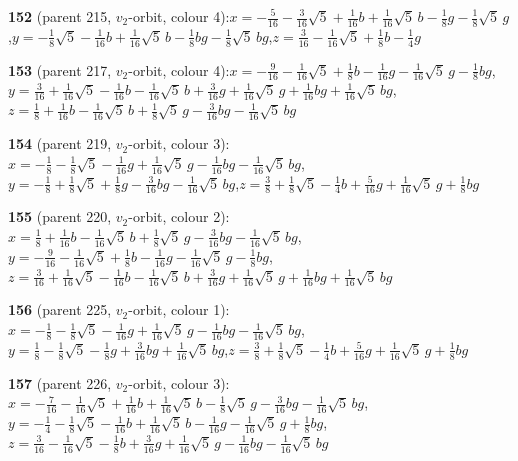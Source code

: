 \documentclass[10pt]{article}
\begin{document}
{\noindent\textbf{152} (parent 215, $v_2$-orbit, colour 4):\quad $x=-\tfrac{5}{16}-\tfrac{3}{16}\sqrt5+\tfrac{1}{16}b+\tfrac{1}{16}\sqrt5\,b-\tfrac{1}{8}g-\tfrac{1}{8}\sqrt5\,g$,\quad $y=-\tfrac{1}{8}\sqrt5-\tfrac{1}{16}b+\tfrac{1}{16}\sqrt5\,b-\tfrac{1}{8}bg-\tfrac{1}{8}\sqrt5\,bg$,\quad $z=\tfrac{3}{16}-\tfrac{1}{16}\sqrt5+\tfrac{1}{8}b-\tfrac{1}{4}g$\par\smallskip
\noindent\textbf{153} (parent 217, $v_2$-orbit, colour 4):\quad $x=-\tfrac{9}{16}-\tfrac{1}{16}\sqrt5+\tfrac{1}{8}b-\tfrac{1}{16}g-\tfrac{1}{16}\sqrt5\,g-\tfrac{1}{8}bg$,\quad $y=\tfrac{3}{16}+\tfrac{1}{16}\sqrt5-\tfrac{1}{16}b-\tfrac{1}{16}\sqrt5\,b+\tfrac{3}{16}g+\tfrac{1}{16}\sqrt5\,g+\tfrac{1}{16}bg+\tfrac{1}{16}\sqrt5\,bg$,\quad $z=\tfrac{1}{8}+\tfrac{1}{16}b-\tfrac{1}{16}\sqrt5\,b+\tfrac{1}{8}\sqrt5\,g-\tfrac{3}{16}bg-\tfrac{1}{16}\sqrt5\,bg$\par\smallskip
\noindent\textbf{154} (parent 219, $v_2$-orbit, colour 3):\quad $x=-\tfrac{1}{8}-\tfrac{1}{8}\sqrt5-\tfrac{1}{16}g+\tfrac{1}{16}\sqrt5\,g-\tfrac{1}{16}bg-\tfrac{1}{16}\sqrt5\,bg$,\quad $y=-\tfrac{1}{8}+\tfrac{1}{8}\sqrt5+\tfrac{1}{8}g-\tfrac{3}{16}bg-\tfrac{1}{16}\sqrt5\,bg$,\quad $z=\tfrac{3}{8}+\tfrac{1}{8}\sqrt5-\tfrac{1}{4}b+\tfrac{5}{16}g+\tfrac{1}{16}\sqrt5\,g+\tfrac{1}{8}bg$\par\smallskip
\noindent\textbf{155} (parent 220, $v_2$-orbit, colour 2):\quad $x=\tfrac{1}{8}+\tfrac{1}{16}b-\tfrac{1}{16}\sqrt5\,b+\tfrac{1}{8}\sqrt5\,g-\tfrac{3}{16}bg-\tfrac{1}{16}\sqrt5\,bg$,\quad $y=-\tfrac{9}{16}-\tfrac{1}{16}\sqrt5+\tfrac{1}{8}b-\tfrac{1}{16}g-\tfrac{1}{16}\sqrt5\,g-\tfrac{1}{8}bg$,\quad $z=\tfrac{3}{16}+\tfrac{1}{16}\sqrt5-\tfrac{1}{16}b-\tfrac{1}{16}\sqrt5\,b+\tfrac{3}{16}g+\tfrac{1}{16}\sqrt5\,g+\tfrac{1}{16}bg+\tfrac{1}{16}\sqrt5\,bg$\par\smallskip
\noindent\textbf{156} (parent 225, $v_2$-orbit, colour 1):\quad $x=-\tfrac{1}{8}-\tfrac{1}{8}\sqrt5-\tfrac{1}{16}g+\tfrac{1}{16}\sqrt5\,g-\tfrac{1}{16}bg-\tfrac{1}{16}\sqrt5\,bg$,\quad $y=\tfrac{1}{8}-\tfrac{1}{8}\sqrt5-\tfrac{1}{8}g+\tfrac{3}{16}bg+\tfrac{1}{16}\sqrt5\,bg$,\quad $z=\tfrac{3}{8}+\tfrac{1}{8}\sqrt5-\tfrac{1}{4}b+\tfrac{5}{16}g+\tfrac{1}{16}\sqrt5\,g+\tfrac{1}{8}bg$\par\smallskip
\noindent\textbf{157} (parent 226, $v_2$-orbit, colour 3):\quad $x=-\tfrac{7}{16}-\tfrac{1}{16}\sqrt5+\tfrac{1}{16}b+\tfrac{1}{16}\sqrt5\,b-\tfrac{1}{8}\sqrt5\,g-\tfrac{3}{16}bg-\tfrac{1}{16}\sqrt5\,bg$,\quad $y=-\tfrac{1}{4}-\tfrac{1}{8}\sqrt5-\tfrac{1}{16}b+\tfrac{1}{16}\sqrt5\,b-\tfrac{1}{16}g-\tfrac{1}{16}\sqrt5\,g+\tfrac{1}{8}bg$,\quad $z=\tfrac{3}{16}-\tfrac{1}{16}\sqrt5-\tfrac{1}{8}b+\tfrac{3}{16}g+\tfrac{1}{16}\sqrt5\,g-\tfrac{1}{16}bg-\tfrac{1}{16}\sqrt5\,bg$\par\smallskip
}
\end{document}

